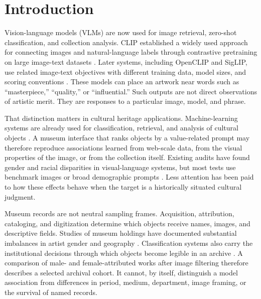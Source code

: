 \documentclass[pdflatex,sn-basic,Numbered]{sn-jnl}
\begin{document}
\maketitle

\section{Introduction}
\label{sec:introduction}

Vision-language models (VLMs) are now used for image retrieval, zero-shot classification, and collection analysis. CLIP established a widely used approach for connecting images and natural-language labels through contrastive pretraining on large image-text datasets \cite{radford2021learning}. Later systems, including OpenCLIP and SigLIP, use related image-text objectives with different training data, model sizes, and scoring conventions \cite{cherti2023reproducible, schuhmann2022laion}. These models can place an artwork near words such as ``masterpiece,'' ``quality,'' or ``influential.'' Such outputs are not direct observations of artistic merit. They are responses to a particular image, model, and phrase.

That distinction matters in cultural heritage applications. Machine-learning systems are already used for classification, retrieval, and analysis of cultural objects \cite{fiorucci2020machine, srinivasan2021arts}. A museum interface that ranks objects by a value-related prompt may therefore reproduce associations learned from web-scale data, from the visual properties of the image, or from the collection itself. Existing audits have found gender and racial disparities in visual-language systems, but most tests use benchmark images or broad demographic prompts \cite{wang2022revisiting, wolfe2022evidence, hall2023auditing}. Less attention has been paid to how these effects behave when the target is a historically situated cultural judgment.

Museum records are not neutral sampling frames. Acquisition, attribution, cataloging, and digitization determine which objects receive names, images, and descriptive fields. Studies of museum holdings have documented substantial imbalances in artist gender and geography \cite{topaz2019diversity, meier2021gender}. Classification systems also carry the institutional decisions through which objects become legible in an archive \cite{bowker2000sorting, noble2018algorithms, caswell2016archival}. A comparison of male- and female-attributed works after image filtering therefore describes a selected archival cohort. It cannot, by itself, distinguish a model association from differences in period, medium, department, image framing, or the survival of named records.
\end{document}
